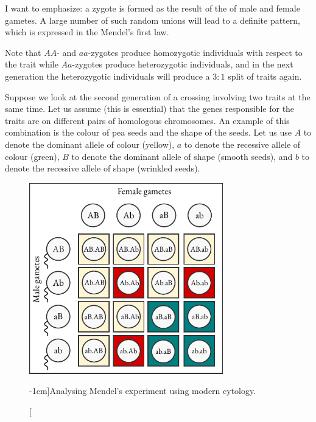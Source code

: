 I want to emphasize: a zygote is formed as the result of the   of male and female gametes. A large number of such random
unions will   lead to a definite pattern, which is expressed in the Mendel's first law.

Note that $AA$- and $aa$-zygotes produce homozygotic individuals with
respect to the trait while $Aa$-zygotes produce heterozygotic individuals,
and in the next generation the heterozygotic individuals will produce
a $3:1$ split of traits again.

 Suppose we look at the second generation of a crossing involving two traits at the same time.
Let us assume (this is essential) that the genes responsible for the traits
are on different pairs of homologous chromosomes. An example of this
combination is the colour of pea seeds and the shape of the seeds. Let
us use $A$ to denote the dominant allele of colour (yellow), $a$ to denote
the recessive allele of colour (green), $B$ to denote the dominant allele of
shape (smooth seeds), and $b$ to denote the recessive allele of shape
(wrinkled seeds).

\begin{figure}[!ht]
\centering
\includegraphics[width=0.75\textwidth]{figures/genes2.pdf}
\caption[][-1cm]{Analysing Mendel's experiment using modern cytology.\label{genes2}}
\end{figure}


